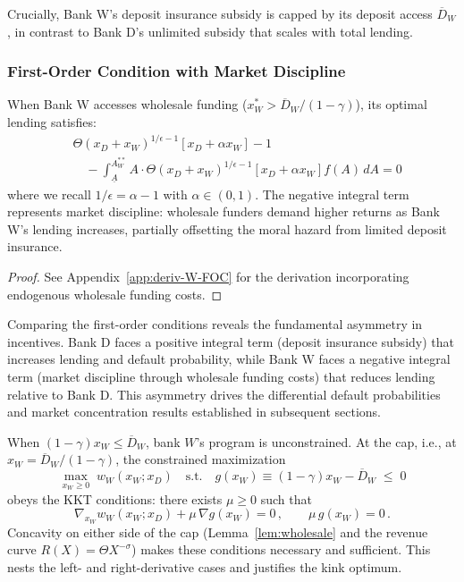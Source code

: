 \documentclass[12pt]{article}
\begin{document}
Crucially, Bank W's deposit insurance subsidy is capped by its deposit access $\overline{D}_{W}$, in contrast to Bank D's unlimited subsidy that scales with total lending.

\subsubsection{First-Order Condition with Market Discipline}
\begin{proposition}\label{prop:bank-w-foc}
When Bank W accesses wholesale funding ($x_{W}^{*} > \overline{D}_{W}/(1-\gamma)$), its optimal lending satisfies:
\begin{align}
    &\Theta(x_{D}+x_{W})^{1/\epsilon-1}[x_{D}+\alpha x_{W}] - 1 \nonumber \\
    &\quad - \int_{\underline{A}}^{A_{W}^{**}} A \cdot \Theta(x_{D}+x_{W})^{1/\epsilon-1}[x_{D}+\alpha x_{W}] f(A)\,dA = 0
\end{align}
where we recall $1/\epsilon = \alpha - 1$ with $\alpha \in (0,1)$. The negative integral term represents market discipline: wholesale funders demand higher returns as Bank W's lending increases, partially offsetting the moral hazard from limited deposit insurance.
\end{proposition}

\begin{proof}
See Appendix~\ref{app:deriv-W-FOC} for the derivation incorporating endogenous wholesale funding costs.
\end{proof}

\begin{remark}
Comparing the first-order conditions reveals the fundamental asymmetry in incentives. Bank D faces a positive integral term (deposit insurance subsidy) that increases lending and default probability, while Bank W faces a negative integral term (market discipline through wholesale funding costs) that reduces lending relative to Bank D. This asymmetry drives the differential default probabilities and market concentration results established in subsequent sections.
\end{remark}

\begin{proposition}\label{prop:kktcap}
When $(1-\gamma)x_W\le \overline D_W$, bank $W$'s program is unconstrained. At the cap, i.e., at $x_W=\overline D_W/(1-\gamma)$, the constrained maximization
\begin{equation}
\max_{x_W\ge 0} \; w_W(x_W;x_D) \quad \text{s.t.}\quad g(x_W)\equiv (1-\gamma)x_W-\overline D_W\;\le\;0
\end{equation}
obeys the KKT conditions: there exists $\mu\ge 0$ such that
\begin{equation}
\nabla_{x_W} w_W(x_W;x_D) + \mu\,\nabla g(x_W)=0\,,\qquad \mu\,g(x_W)=0\, .
\end{equation}
Concavity on either side of the cap (Lemma~\ref{lem:wholesale} and the revenue curve $R(X)=\Theta X^{-\sigma}$) makes these conditions necessary and sufficient. This nests the left- and right-derivative cases and justifies the kink optimum.
\end{proposition}
\end{document}
